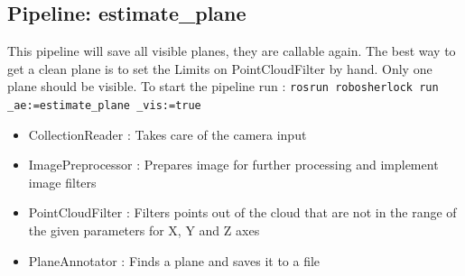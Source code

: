 \documentclass[main.tex]{subfiles}
\begin{document}
			\subsection{Pipeline: estimate\_plane}
This pipeline will save all visible planes, they are callable again. The best way to get a clean plane is to set the Limits on PointCloudFilter by hand. Only one plane should be visible. To start the pipeline run : \texttt{rosrun robosherlock run \_ae:=estimate\_plane \_vis:=true} 
\begin{itemize}
	\item CollectionReader : Takes care of the camera input
	\item ImagePreprocessor : Prepares image for further processing and implement image filters  
	\item PointCloudFilter : Filters points out of the cloud that are not in the range of the given parameters for X, Y and Z axes
	\item PlaneAnnotator : Finds a plane and saves it to a file 
\end{itemize}
\end{document}
